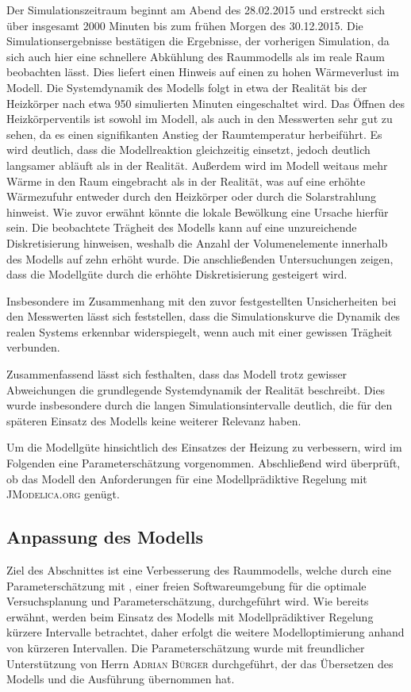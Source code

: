 Der Simulationszeitraum beginnt am Abend des 28.02.2015 und erstreckt sich über insgesamt 2000 Minuten bis zum frühen Morgen des 30.12.2015. Die Simulationsergebnisse bestätigen die Ergebnisse, der vorherigen Simulation, da sich auch hier eine schnellere Abkühlung des Raummodells als im reale Raum beobachten lässt. Dies liefert einen Hinweis auf einen zu hohen Wärmeverlust im Modell.
Die Systemdynamik des Modells folgt in etwa der Realität bis der Heizkörper nach etwa 950 simulierten Minuten eingeschaltet wird. 
Das Öffnen des Heizkörperventils ist sowohl im Modell, als auch in den Messwerten sehr gut zu sehen, da es einen signifikanten Anstieg der Raumtemperatur herbeiführt. Es wird deutlich, dass die Modellreaktion gleichzeitig einsetzt, jedoch deutlich langsamer abläuft als in der Realität. Außerdem wird im Modell weitaus mehr Wärme in den Raum eingebracht als in der Realität, was auf eine erhöhte Wärmezufuhr entweder durch den Heizkörper oder durch die Solarstrahlung hinweist. Wie zuvor erwähnt könnte die lokale Bewölkung eine Ursache hierfür sein.
Die beobachtete Trägheit des Modells kann auf eine unzureichende Diskretisierung hinweisen, weshalb die Anzahl der Volumenelemente innerhalb des Modells auf zehn erhöht wurde. Die anschließenden Untersuchungen zeigen, dass die Modellgüte durch die erhöhte Diskretisierung gesteigert wird.

Insbesondere im Zusammenhang mit den zuvor festgestellten Unsicherheiten bei den Messwerten lässt sich feststellen, dass die Simulationskurve die Dynamik des realen Systems erkennbar widerspiegelt, wenn auch mit einer gewissen Trägheit verbunden.

Zusammenfassend lässt sich festhalten, dass das Modell trotz gewisser Abweichungen die grundlegende Systemdynamik der Realität beschreibt. Dies wurde insbesondere durch die langen Simulationsintervalle deutlich, die für den späteren Einsatz des Modells keine weiterer Relevanz haben.

Um die Modellgüte hinsichtlich des Einsatzes der Heizung zu verbessern, wird im Folgenden eine Parameterschätzung vorgenommen. Abschließend wird überprüft, ob das Modell den Anforderungen für eine Modellprädiktive Regelung mit \textsc{JModelica.org} genügt.


\subsection{Anpassung des Modells}

Ziel des Abschnittes ist eine Verbesserung des Raummodells, welche durch eine Parameterschätzung mit \cite{casiopeia}, einer freien Softwareumgebung für die optimale Versuchsplanung und Parameterschätzung, durchgeführt wird.
Wie bereits erwähnt, werden beim Einsatz des Modells mit Modellprädiktiver Regelung kürzere Intervalle betrachtet, daher erfolgt die weitere Modelloptimierung anhand von kürzeren Intervallen. Die Parameterschätzung wurde mit freundlicher Unterstützung von Herrn \textsc{Adrian Bürger} durchgeführt, der das Übersetzen des Modells und die Ausführung übernommen hat.

